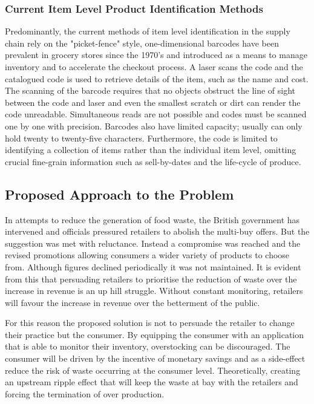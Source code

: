 \documentclass[a4paper, 11pt]{article}
\begin{document}
\subsubsection{Current Item Level Product Identification Methods} 
Predominantly, the current methods of item level identification in the supply chain rely on the "picket-fence" style, one-dimensional barcodes \cite{georgeR} have been prevalent in grocery stores since the 1970's and introduced as a means to manage inventory and to accelerate the checkout process. A laser scans the code and the catalogued code is used to retrieve details of the item, such as the name and cost. The scanning of the barcode requires that no objects obstruct the line of sight between the code and laser and even the smallest scratch or dirt can render the code unreadable. Simultaneous reads are not possible and codes must be scanned one by one with precision. Barcodes also have limited capacity; usually can only hold twenty to twenty-five characters. Furthermore, the code is limited to identifying a collection of items rather than the individual item level, omitting crucial fine-grain information such as sell-by-dates and the life-cycle of produce. 

\subsection{Proposed Approach to the Problem}
In attempts to reduce the generation of food waste, the British government has intervened and officials pressured retailers to abolish the multi-buy offers. But the suggestion was met with reluctance. Instead a compromise was reached and the revised promotions allowing consumers a wider variety of products to choose from. Although figures declined periodically it was not maintained. It is evident from this that persuading retailers to prioritise the reduction of waste over the increase in revenue is an up hill struggle. Without constant monitoring, retailers will favour the increase in revenue over the betterment of the public.\cite{waste}

For this reason the proposed solution is not to persuade the retailer to change their practice but the consumer. By equipping the consumer with an application that is able to monitor their inventory, overstocking can be discouraged. The consumer will be driven by the incentive of monetary savings and as a side-effect reduce the risk of waste occurring at the consumer level. Theoretically, creating an upstream ripple effect that will keep the waste at bay with the retailers and forcing the termination of over production. 
\end{document}
